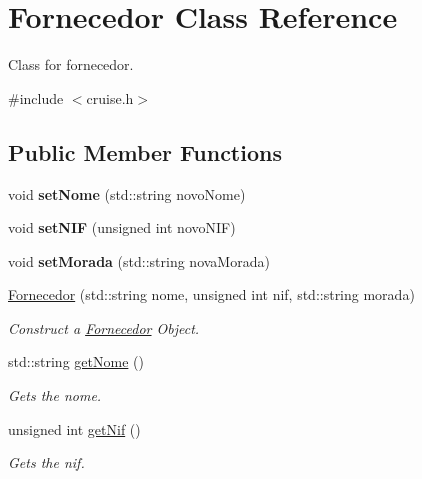 \hypertarget{classFornecedor}{}\section{Fornecedor Class Reference}
\label{classFornecedor}


Class for fornecedor.  




{\ttfamily \#include $<$cruise.\+h$>$}

\subsection*{Public Member Functions}
\begin{DoxyCompactItemize}
\item 
\mbox{\label{classFornecedor_a2f207b2242cf6ec5d76a3808dbb4fd80}} 
void {\bfseries set\+Nome} (std\+::string novo\+Nome)
\item 
\mbox{\label{classFornecedor_a9bbb88ef7aa281df4042aeedadcd510e}} 
void {\bfseries set\+N\+IF} (unsigned int novo\+N\+IF)
\item 
\mbox{\label{classFornecedor_a240f4abc6ac49f030c93679b3628e222}} 
void {\bfseries set\+Morada} (std\+::string nova\+Morada)
\item 
\hyperlink{classFornecedor_a0cbc4556289cc946756039ab0da52756}{Fornecedor} (std\+::string nome, unsigned int nif, std\+::string morada)
\begin{DoxyCompactList}\small\item\em Construct a \hyperlink{classFornecedor}{Fornecedor} Object. \end{DoxyCompactList}\item 
std\+::string \hyperlink{classFornecedor_a8d14dd862259e29adef0e283f15cbb16}{get\+Nome} ()
\begin{DoxyCompactList}\small\item\em Gets the nome. \end{DoxyCompactList}\item 
unsigned int \hyperlink{classFornecedor_aec536b071f628fc1aa468071fa5a6067}{get\+Nif} ()
\begin{DoxyCompactList}\small\item\em Gets the nif. \end{DoxyCompactList}\item 

\end{DoxyCompactItemize}
